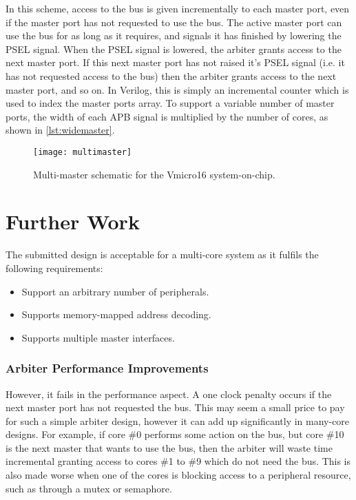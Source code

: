 In this scheme, access to the bus is given incrementally to each master port, even if the master port has not requested to use the bus. The active master port can use the bus for as long as it requires, and signals it has finished by lowering the PSEL signal. When the PSEL signal is lowered, the arbiter grants access to the next master port. If this next master port has not raised it's PSEL signal (i.e. it has not requested access to the bus) then the arbiter grants access to the next master port, and so on. In Verilog, this is simply an incremental counter which is used to index the master ports array. To support a variable number of master ports, the width of each APB signal is multiplied by the number of cores, as shown in \cref{lst:widemaster}.

\begin{figure}[H]
\centering
\texttt{[image: multimaster]}
\caption{Multi-master schematic for the Vmicro16 system-on-chip.}
\label{fig:multimaster}
\end{figure}

\section{Further Work}
The submitted design is acceptable for a multi-core system as it fulfils the following requirements:
\begin{itemize}
\item Support an arbitrary number of peripherals.
\item Supports memory-mapped address decoding.
\item Supports multiple master interfaces.
\end{itemize}

\subsubsection*{Arbiter Performance Improvements}
However, it fails in the performance aspect. A one clock penalty occurs if the next master port has not requested the bus. This may seem a small price to pay for such a simple arbiter design, however it can add up significantly in many-core designs. For example, if core \#0 performs some action on the bus, but core \#10 is the next  master that wants to use the bus, then the arbiter will waste time incremental granting access to cores \#1 to \#9 which do not need the bus. This is also made worse when one of the cores is blocking access to a peripheral resource, such as through a mutex or semaphore.

